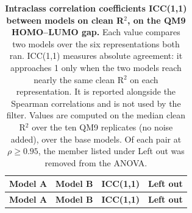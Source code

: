 
{\scriptsize
\begin{longtable}{llcc}
\caption{\textbf{\SuppFile{} Intraclass correlation coefficients ICC(1,1) between models on clean R$^2$, on the QM9 HOMO--LUMO gap.}
Each value compares two models over the six representations both ran. ICC(1,1) measures absolute agreement: it approaches 1 only when the two models reach nearly the same clean R$^2$ on each representation. It is reported alongside the Spearman correlations and is not used by the filter. Values are computed on the median clean R$^2$ over the ten QM9 replicates (no noise added), over the base models. Of each pair at $\rho \geq 0.95$, the member listed under Left out was removed from the ANOVA.}
\label{supp:model_icc}\\
\toprule
\textbf{Model A} & \textbf{Model B} & \textbf{ICC(1,1)} & \textbf{Left out} \\
\midrule
\endfirsthead
\toprule
\textbf{Model A} & \textbf{Model B} & \textbf{ICC(1,1)} & \textbf{Left out} \\
\midrule
\endhead

\bottomrule
\end{longtable}}
